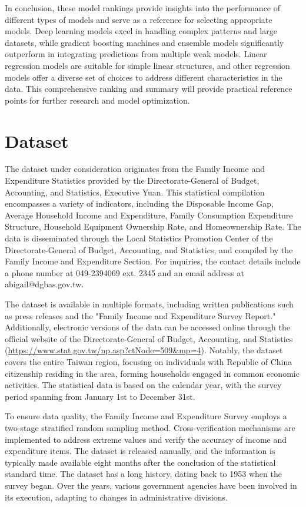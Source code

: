 \documentclass[twocolumn]{article}
\begin{document}
In conclusion, these model rankings provide insights into the performance of different types of models and serve as a reference for selecting appropriate models. Deep learning models excel in handling complex patterns and large datasets, while gradient boosting machines and ensemble models significantly outperform in integrating predictions from multiple weak models. Linear regression models are suitable for simple linear structures, and other regression models offer a diverse set of choices to address different characteristics in the data. This comprehensive ranking and summary will provide practical reference points for further research and model optimization.

\newpage
\printbibliography[heading=bibintoc, title={References}]
\nocite{*}

\appendix
\section{Dataset}
The dataset under consideration originates from the Family Income and Expenditure Statistics provided by the Directorate-General of Budget, Accounting, and Statistics, Executive Yuan. This statistical compilation encompasses a variety of indicators, including the Disposable Income Gap, Average Household Income and Expenditure, Family Consumption Expenditure Structure, Household Equipment Ownership Rate, and Homeownership Rate. The data is disseminated through the Local Statistics Promotion Center of the Directorate-General of Budget, Accounting, and Statistics, and compiled by the Family Income and Expenditure Section. For inquiries, the contact details include a phone number at 049-2394069 ext. 2345 and an email address at abigail@dgbas.gov.tw.

The dataset is available in multiple formats, including written publications such as press releases and the "Family Income and Expenditure Survey Report." Additionally, electronic versions of the data can be accessed online through the official website of the Directorate-General of Budget, Accounting, and Statistics (\url{https://www.stat.gov.tw/np.asp?ctNode=509&mp=4}). Notably, the dataset covers the entire Taiwan region, focusing on individuals with Republic of China citizenship residing in the area, forming households engaged in common economic activities. The statistical data is based on the calendar year, with the survey period spanning from January 1st to December 31st.

To ensure data quality, the Family Income and Expenditure Survey employs a two-stage stratified random sampling method. Cross-verification mechanisms are implemented to address extreme values and verify the accuracy of income and expenditure items. The dataset is released annually, and the information is typically made available eight months after the conclusion of the statistical standard time. The dataset has a long history, dating back to 1953 when the survey began. Over the years, various government agencies have been involved in its execution, adapting to changes in administrative divisions.
\end{document}
